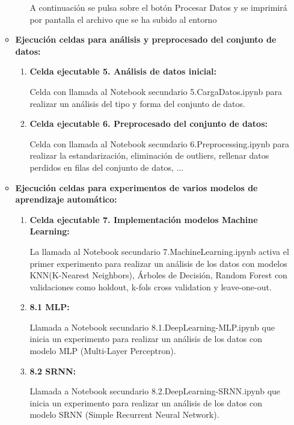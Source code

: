 \begin{enumerate}
\begin{itemize}
\begin{enumerate}
	
	A continuación se pulsa sobre el botón Procesar Datos y se imprimirá por pantalla el archivo que se ha subido al entorno
	
	\end{enumerate} 
	
   \item
   \textbf{Ejecución celdas para análisis y preprocesado del conjunto de datos: } 
	\begin{enumerate}
	\def\labelenumi{\arabic{enumi}.}
	\tightlist
	\item 
	\textbf{Celda ejecutable 5. Análisis de datos inicial: }
	
	Celda con llamada al Notebook secundario 5.CargaDatos.ipynb para realizar un análisis del tipo y forma del conjunto de datos.
	\item 
	\textbf{Celda ejecutable 6. Preprocesado del conjunto de datos:}
	
	Celda con llamada al Notebook secundario 6.Preprocessing.ipynb para realizar la estandarización, eliminación de outliers, rellenar datos perdidos en filas del conjunto de datos, ...
	\end{enumerate} 
	
   \item
   \textbf{Ejecución celdas para experimentos de varios modelos de aprendizaje automático: } 
	\begin{enumerate}
	\def\labelenumi{\arabic{enumi}.}
	\tightlist
	\item 
	\textbf{Celda ejecutable 7. Implementación modelos Machine Learning: }
	
	La llamada al Notebook secundario 7.MachineLearning.ipynb activa el primer experimento para realizar un análisis de los datos con modelos KNN(K-Nearest Neighbors), Árboles de Decisión, Random Forest con validaciones como holdout, k-fols cross validation y leave-one-out. 
	\item 
	\textbf{8.1 MLP:}
	
	Llamada a Notebook secundario 8.1.DeepLearning-MLP.ipynb que inicia un experimento para realizar un análisis de los datos con modelo MLP (Multi-Layer Perceptron).
	\item 
	\textbf{8.2 SRNN:}
	
	Llamada a Notebook secundario 8.2.DeepLearning-SRNN.ipynb que inicia un experimento para realizar un análisis de los datos con modelo SRNN (Simple Recurrent Neural Network).	
	

\end{enumerate}
\end{itemize}
\end{enumerate}
